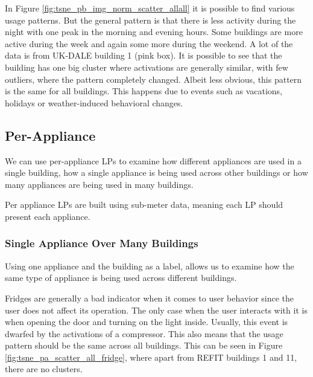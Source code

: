 In Figure \ref{fig:tsne_pb_img_norm_scatter_allall} it is possible to find various usage patterns. 
But the general pattern is that there is less activity during the night with one peak in the morning and evening hours.
Some buildings are more active during the week and again some more during the weekend.
A lot of the data is from UK-DALE building 1 (pink box). 
It is possible to see that the building has one big cluster where activations are generally similar, with few outliers, where the pattern completely changed. 
Albeit less obvious, this pattern is the same for all buildings.
This happens due to events such as vacations, holidays or weather-induced behavioral changes.

\subsection{Per-Appliance}

We can use per-appliance LPs to examine how different appliances 
are used in a single building, how a single appliance is being used across other buildings
or how many appliances are being used in many buildings.

Per appliance LPs are built using sub-meter data,
meaning each LP should present each appliance.

\subsubsection{Single Appliance Over Many Buildings}

Using one appliance and the building as a label,
allows us to examine how the same type of appliance is being used across different buildings.

Fridges are generally a bad indicator when it comes to user behavior since the user does not affect its operation. 
The only case when the user interacts with it is when opening the door and turning on the light inside. 
Usually, this event is dwarfed by the activations of a compressor. 
This also means that the usage pattern should be the same across all buildings. 
This can be seen in Figure \ref{fig:tsne_pa_scatter_all_fridge}, 
where apart from REFIT buildings 1 and 11, there are no clusters.


